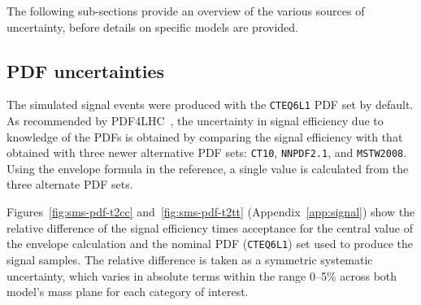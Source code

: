 The following sub-sections provide an overview of the various sources of
uncertainty, before details on specific models are provided. 
%
%
%
%
\subsection{PDF uncertainties\label{sec:pdf-sets}}

The simulated signal events were produced with the \verb!CTEQ6L1! PDF
set by default.  As recommended by PDF4LHC~\cite{pdf4lhc}, the uncertainty
in signal efficiency due to knowledge of the PDFs is obtained by comparing 
the signal efficiency with that obtained with three newer alternative PDF 
sets: \verb!CT10!, \verb!NNPDF2.1!, and \verb!MSTW2008!. Using the envelope
formula in the reference, a single value is calculated from the three alternate
PDF sets. 

Figures~\ref{fig:sms-pdf-t2cc} and~\ref{fig:sms-pdf-t2tt} 
(Appendix~\ref{app:signal}) show the relative difference of the signal 
efficiency times acceptance for the central value of the envelope calculation 
and the nominal PDF (\verb!CTEQ6L1!) set used to produce the signal 
samples. The relative difference is taken as a symmetric systematic 
uncertainty, which varies in absolute terms within the range 0--5\% 
across both model's mass plane for each category of interest.


